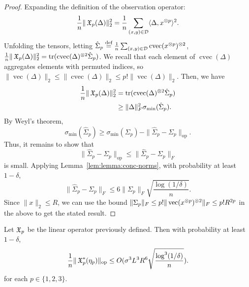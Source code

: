 \documentclass[tablecaption=bottom]{jmlr}
\newcommand\eqdef{\ensuremath{\stackrel{\textrm{def}}{=}}} %
\newcommand\sD{\ensuremath{\mathcal{D}}}
\newcommand\sigmamin{\sigma_\textrm{min}}
\newcommand\op{{\textrm{op}}}
\newcommand\reflem[1]{Lemma~\ref{lem:#1}}
\newcommand{\Lop}{\textrm{op}}
\DeclareMathOperator{\cvec} {cvec}
\DeclareMathOperator{\vvec} {vec}
\begin{document}
\begin{proof}
Expanding the definition of the observation operator:
$$\frac{1}{n} \|\opX_p(\Delta)\|_2^2 = \frac{1}{n} \sum_{(x,y) \in \sD} \innerp{\Delta}{x\tp{p}}^2.$$
Unfolding the tensors, letting $\hat\Sigma_p \eqdef \frac{1}{n}
\sum_{(x,y) \in \sD} \cvec(x\tp{p})\tp{2}$, $\frac{1}{n}
\|\opX_p(\Delta)\|_2^2 = \trace(\cvec(\Delta)\tp{2} \hat\Sigma_p)$. 
We recall that each element of $\cvec(\Delta)$ aggregates elements with
permuted indices, so $\|\vvec(\Delta)\|_2 \le \|\cvec(\Delta)\|_2 \le p!
\|\vvec(\Delta)\|_2$. Then, we have 
\begin{align}
\frac{1}{n} \|\opX_p(\Delta)\|_2^2 
  &= \trace(\cvec(\Delta)\tp{2} \hat\Sigma_p) \\
  &\ge \|\Delta\|_F^2 \sigmamin(\hat\Sigma_p).
\end{align}
By Weyl's theorem, $$\sigmamin(\hat\Sigma_p) \ge
\sigmamin(\Sigma_p) - \|\hat\Sigma_p - \Sigma_p\|_\Lop.$$ Thus, it
remains to show that $$\|\hat\Sigma_p - \Sigma_p\|_\Lop \le
\|\hat\Sigma_p - \Sigma_p\|_{F}$$ is small. Applying \reflem{lemma:conc-norms}, with
probability at least $1 - \delta$, $$\| \hat\Sigma_p - \Sigma_p \|_F
\le 6 \|\Sigma_p\|_F \sqrt{\frac{\log(1/\delta)}{n}}.$$ Since $\|x\|_2 \le R$, we can use the
bound $\| \Sigma_p \|_F \le p! \| \vvec(x\tp{p})\tp{2} \|_F \le p!
R^{2p}$ in the above to get the stated result. 

\end{proof}

\begin{lemma}
\label{lem:lowRankUpper}
Let $\operatorname{\mathfrak{X}}_p$ be the linear operator previously defined. Then with
probability at least $1-\delta$,
$$\frac1{n} \|\opX_p^*(\eta_p)\|_\op \le O(\sigma^3 L^3 R^6 \sqrt{\frac{\log^3(1/\delta)}{n}}).$$
for each $p \in \{1,2,3\}$.
\end{lemma}
\end{document}
